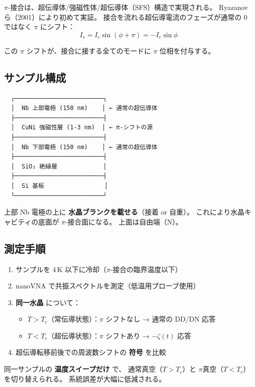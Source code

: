 \documentclass[11pt,a4paper]{article}
\begin{document}
$\pi$-接合は、超伝導体/強磁性体/超伝導体（SFS）構造で実現される。
Ryazanov ら（2001）により初めて実証。
接合を流れる超伝導電流のフェーズが通常の 0 ではなく $\pi$ にシフト：
\begin{equation}
  I_s = I_c \sin(\phi + \pi) = -I_c \sin\phi
\end{equation}

この $\pi$ シフトが、接合に接する全てのモードに $\pi$ 位相を付与する。

\subsection{サンプル構成}

\begin{verbatim}
  ┌─────────────────────────┐
  │  Nb 上部電極 (150 nm)    │ ← 通常の超伝導体
  ├─────────────────────────┤
  │  CuNi 強磁性層 (1-3 nm)  │ ← π-シフトの源
  ├─────────────────────────┤
  │  Nb 下部電極 (150 nm)    │ ← 通常の超伝導体
  ├─────────────────────────┤
  │  SiO₂ 絶縁層             │
  ├─────────────────────────┤
  │  Si 基板                 │
  └─────────────────────────┘
\end{verbatim}

上部 Nb 電極の上に \textbf{水晶ブランクを載せる}（接着 or 自重）。
これにより水晶キャビティの底面が $\pi$-接合面になる。
上面は自由端（N）。

\subsection{測定手順}

\begin{enumerate}
\item サンプルを 4\,K 以下に冷却（$\pi$-接合の臨界温度以下）
\item nanoVNA で共振スペクトルを測定（低温用プローブ使用）
\item \textbf{同一水晶} について：
  \begin{itemize}
  \item $T > T_c$（常伝導状態）：$\pi$ シフトなし → 通常の DD/DN 応答
  \item $T < T_c$（超伝導状態）：$\pi$ シフトあり → $-\zeta(t)$ 応答
  \end{itemize}
\item 超伝導転移前後での周波数シフトの \textbf{符号} を比較
\end{enumerate}

\begin{tcolorbox}[colback=green!5,colframe=green!50!black,title=Phase 2 の美しさ]
同一サンプルの \textbf{温度スイープだけ} で、
通常真空（$T > T_c$）と $\pi$真空（$T < T_c$）を切り替えられる。
系統誤差が大幅に低減される。
\end{tcolorbox}
\end{document}
